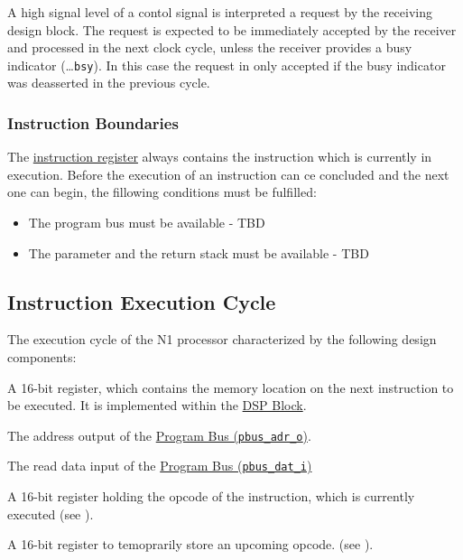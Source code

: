 A high signal level of a contol signal is interpreted a request by the receiving design block.
The request is expected to be immediately accepted by the receiver and processed in the next clock cycle,
unless the receiver provides a busy indicator (\dots\texttt{bsy}).
In this case the request in only accepted if the busy indicator was deasserted in the previous cycle.

\subsubsection{Instruction Boundaries}
\label{architecture:principles:ibounds}

The \hyperref[architecture:comp:ir]{instruction register} always contains the instruction which is currently in execution.
Before the execution of an instruction can ce concluded and the next one can begin, the fillowing conditions must be fulfilled:
\begin{itemize}

\item   
The program bus must be available - TBD
  
\item   
The parameter and the return stack must be available - TBD
  
\end{itemize}

\subsection{Instruction Execution Cycle}
\label{architecture:excyc}

The execution cycle of the N1 processor characterized by the following design components:
\begin{description}[style=nextline]

\item[\textbf{Program Counter}]
A 16-bit register, which contains the memory location on the next instruction to be executed.  
It is implemented within the \hyperref[architecture:comp:dsp]{DSP Block}.

\item[\textbf{Address Bus}]
The address output of the \hyperref[integration:if:pbus]{Program Bus (\texttt{pbus\_adr\_o})}.

\item[\textbf{Read Data Bus}]
The read data input of the \hyperref[integration:if:pbus]{Program Bus (\texttt{pbus\_dat\_i})}

\item[\textbf{Instruction Register}]
A 16-bit register holding the opcode of the instruction, which is currently executed (see ).

\item[\textbf{Instruction Stash Register}]
A 16-bit register to temoprarily store an upcoming opcode. (see ).

\end{description}

